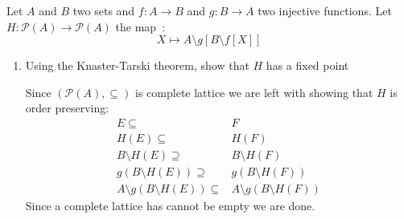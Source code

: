 \documentclass[a4paper,11pt]{exam}
\begin{document}
\begin{questions}
\begin{enumerate}
\begin{solution}
				
			\end{solution}
		\end{enumerate}
		
		Let $A$ and $B$ two sets and $f:A \to B$ and $g: B \to A$ two injective functions.
		Let $H:\mathcal{P}(A)\to  \mathcal{P}(A)$ the map~:
		$$
		X \mapsto A \setminus g[B \setminus f[X]]
		$$
		\begin{enumerate}
			\item Using the Knaster-Tarski theorem, show that $ H $ has a fixed point
			
			\begin{solution}
				Since $(\mathcal{P}(A),\subseteq)$ is complete lattice we are left with showing that $H$ is order preserving: 
				\begin{align*}
				E \subseteq&  F\\
				H(E) \subseteq& H(F)\\
				B\setminus H(E) \supseteq&  B\setminus H(F)\\
				g\left(B\setminus H(E)\right)  \supseteq&  g\left(B\setminus H(F)\right)\\
				A\setminus g\left(B\setminus H(E)\right) \subseteq& A\setminus g\left(B\setminus H(F)\right)
				\end{align*}
				Since a complete lattice has cannot be empty we are done.
				

\end{solution}
\end{enumerate}
\end{questions}
\end{document}
